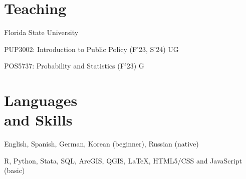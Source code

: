 \documentclass[margin,line,10.95pt]{res}
\newenvironment{list1}{
  \begin{list}{\ding{113}}{%
      \setlength{\itemsep}{0in}
      \setlength{\parsep}{0in} \setlength{\parskip}{0in}
      \setlength{\topsep}{0in} \setlength{\partopsep}{0in}
      \setlength{\leftmargin}{0.17in}}}{\end{list}}
\begin{document}
\begin{resume}
\section{\sc Teaching }

{Florida State University}\\
\vspace*{-.1in}
\begin{list1}
\item[] PUP3002: Introduction to Public Policy (F'23, S'24) UG
\item[] POS5737: Probability and Statistics (F'23) G
\end{list1}





\section{\sc Languages \\ and Skills}
English, Spanish, German, Korean (beginner), Russian (native)
\vspace*{-4.5mm}

R, Python, Stata, SQL, ArcGIS, QGIS, \LaTeX , HTML5/CSS and JavaScript (basic) 
\vspace*{-2.5mm}


\end{resume}
\end{document}
